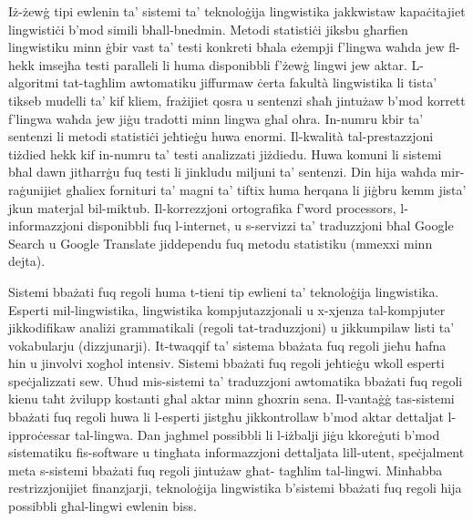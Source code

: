 \begin{multicols}{2}
   
Iż-żewġ tipi ewlenin ta’ sistemi ta’ teknoloġija lingwistika jakkwistaw kapaċitajiet lingwistiċi b’mod simili bħall-bnedmin. Metodi statistiċi jiksbu għarfien lingwistiku minn ġbir vast ta’ testi konkreti bħala eżempji f'lingwa waħda jew fl-hekk imsejħa testi paralleli li huma disponibbli f’żewġ lingwi jew aktar. L-algoritmi tat-tagħlim awtomatiku jiffurmaw ċerta  fakultà lingwistika li tista’ tikseb mudelli ta’ kif kliem, frażijiet qosra u sentenzi sħaħ jintużaw b’mod korrett f'lingwa waħda jew jiġu tradotti minn lingwa għal oħra. In-numru kbir ta’ sentenzi li metodi statistiċi jeħtieġu huwa enormi. Il-kwalità tal-prestazzjoni tiżdied hekk kif in-numru ta’ testi analizzati jiżdiedu. Huwa komuni li sistemi bħal dawn jitħarrġu fuq testi li jinkludu miljuni ta’ sentenzi. Din hija waħda mir-raġunijiet għaliex fornituri ta’ magni ta’ tiftix huma ħerqana li jiġbru kemm jista’ jkun materjal bil-miktub. Il-korrezzjoni ortografika f’word processors, l-informazzjoni disponibbli fuq l-internet, u s-servizzi ta’ traduzzjoni bħal Google Search u Google Translate jiddependu fuq metodu statistiku (mmexxi minn dejta).

   
Sistemi bbażati fuq regoli huma t-tieni tip ewlieni ta’ teknoloġija lingwistika. Esperti mil-lingwistika, lingwistika kompjutazzjonali u x-xjenza tal-kompjuter jikkodifikaw analiżi grammatikali (regoli tat-traduzzjoni) u jikkumpilaw listi ta’ vokabularju (dizzjunarji). It-twaqqif ta’ sistema bbażata fuq regoli jieħu ħafna ħin u jinvolvi xogħol intensiv. Sistemi bbażati fuq regoli jeħtieġu wkoll esperti speċjalizzati sew. Uħud mis-sistemi ta’ traduzzjoni awtomatika bbażati fuq regoli kienu taħt żvilupp kostanti għal aktar minn għoxrin sena. Il-vantaġġ tas-sistemi bbażati fuq regoli huwa li l-esperti jistgħu jikkontrollaw b’mod aktar dettaljat l-ipproċessar tal-lingwa. Dan jagħmel possibbli li l-iżbalji jiġu kkoreġuti b’mod sistematiku fis-software u tingħata informazzjoni dettaljata lill-utent, speċjalment meta s-sistemi bbażati fuq regoli jintużaw għat- tagħlim tal-lingwi. Minħabba restrizzjonijiet finanzjarji, teknoloġija lingwistika b’sistemi bbażati fuq regoli hija possibbli għal-lingwi ewlenin biss.
\end{multicols}

